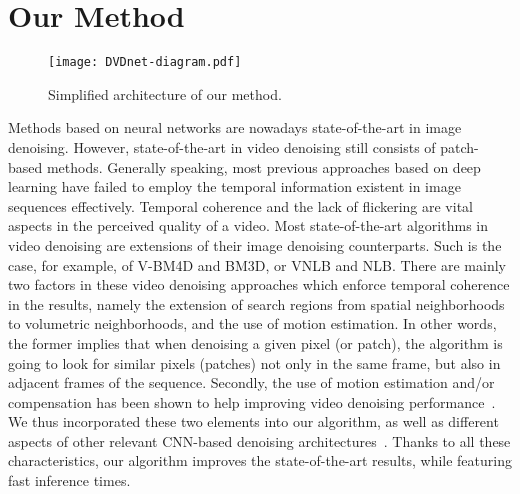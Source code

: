 \documentclass{article}
\begin{document}
	\section{Our Method}
	\label{sec:method}
\begin{figure*}[htb] \begin{minipage}[b]{1.0\linewidth}
			\centering
			\centerline{\texttt{[image: DVDnet-diagram.pdf]}}
\end{minipage}
\caption{Simplified architecture of our method.}
		\label{fig:architecture}
	\end{figure*}
Methods based on neural networks are nowadays state-of-the-art in image denoising. However, state-of-the-art in video denoising still consists of patch-based methods. Generally speaking, most previous approaches based on deep learning have failed to employ the temporal information existent in image sequences effectively. Temporal coherence and the lack of flickering are vital aspects in the perceived quality of a video. Most state-of-the-art algorithms in video denoising are extensions of their image denoising counterparts. Such is the case, for example, of V-BM4D and BM3D, or VNLB and NLB. There are mainly two factors in these video denoising approaches which enforce temporal coherence in the results, namely the extension of search regions from spatial neighborhoods to volumetric neighborhoods, and the use of motion estimation. In other words, the former implies that when denoising a given pixel (or patch), the algorithm is going to look for similar pixels (patches) not only in the same frame, but also in adjacent frames of the sequence. Secondly, the use of motion estimation and/or compensation has been shown to help improving video denoising performance~\cite{Buades2016a,Arias2018,Maggioni2012}. We thus incorporated these two elements into our algorithm, as well as different aspects of other relevant CNN-based denoising architectures~\cite{Zhang2017a,Gharbi2016,vogels2018denoising}. Thanks to all these characteristics, our algorithm improves the state-of-the-art results, while featuring fast inference times.
	
\end{document}
